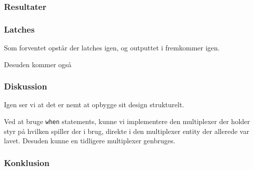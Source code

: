 {    

    \subsubsection{Resultater}

    \subsubsection*{Latches}

    Som forventet opstår der latches igen, og outputtet i  fremkommer igen. 

    Desuden kommer også 


    \subsubsection{Diskussion}

    Igen ser vi at det er nemt at opbygge sit design strukturelt.

    Ved at bruge \texttt{when} statements, kunne vi implementere den multiplexer der holder styr på hvilken spiller der i brug, direkte i den multiplexer entity der allerede var lavet. Desuden kunne en tidligere multiplexer genbruges.

    \subsubsection{Konklusion}

}
